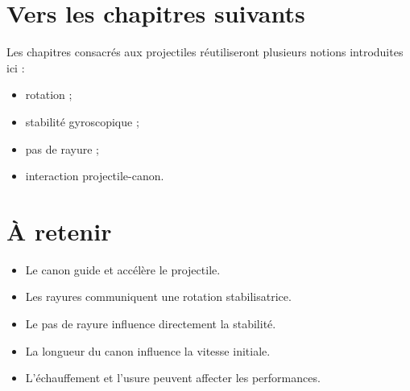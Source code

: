 \section{Vers les chapitres suivants}

Les chapitres consacrés aux projectiles réutiliseront plusieurs notions
introduites ici :

\begin{itemize}
    \item rotation ;
    \item stabilité gyroscopique ;
    \item pas de rayure ;
    \item interaction projectile-canon.
\end{itemize}

\section{À retenir}

\begin{aretenir}

\begin{itemize}
    \item Le canon guide et accélère le projectile.
    \item Les rayures communiquent une rotation stabilisatrice.
    \item Le pas de rayure influence directement la stabilité.
    \item La longueur du canon influence la vitesse initiale.
    \item L'échauffement et l'usure peuvent affecter les performances.
\end{itemize}

\end{aretenir}
